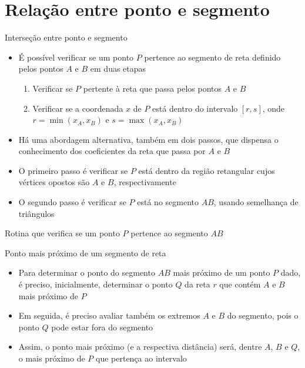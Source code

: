\section{Relação entre ponto e segmento}

\begin{frame}[fragile]{Interseção entre ponto e segmento}
    \begin{itemize}
        \item É possível verificar se um ponto $P$ pertence ao segmento de reta definido pelos pontos $A$ e $B$ em duas etapas
        \pause
        \begin{enumerate}
            \item Verificar se $P$ pertente à reta que passa pelos pontos $A$ e $B$
            \pause

            \item Verificar se a coordenada $x$ de $P$ está dentro do intervalo $[r, s]$, onde $r = \min(x_A, x_B)$ e $s = \max(x_A, x_B)$
        \end{enumerate}
            \pause

        \item Há uma abordagem alternativa, também em dois passos, que dispensa o conhecimento dos coeficientes da reta que passa por $A$ e $B$
        \pause


        \item O primeiro passo é verificar se $P$ está dentro da região retangular cujos vértices opostos são $A$ e $B$, respectivamente
        \pause

        \item O segundo passo é verificar se $P$ está no segmento $AB$, usando semelhança de triângulos
    \end{itemize} 

\end{frame}

\begin{frame}[fragile]{Rotina que verifica se um ponto $P$ pertence ao segmento $AB$}
\end{frame}


\begin{frame}[fragile]{Ponto mais próximo de um segmento de reta}

    \begin{itemize}
        \item Para determinar o ponto do segmento $AB$ mais próximo de um ponto $P$ dado, é
            preciso, inicialmente, determinar o ponto $Q$ da reta $r$ que contém $A$ e $B$ mais
            próximo de $P$
        \pause

        \item Em seguida, é preciso avaliar também os extremos $A$ e $B$ do segmento, pois o ponto
            $Q$ pode estar fora do segmento
        \pause

        \item Assim, o ponto mais próximo (e a respectiva distância) será, dentre $A$, $B$ e $Q$,
            o mais próximo de $P$ que pertença ao intervalo

    \end{itemize}

\end{frame}

